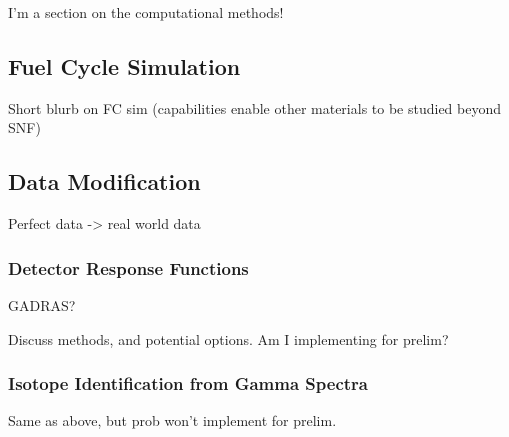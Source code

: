 I'm a section on the computational methods!

\subsection{Fuel Cycle Simulation}

Short blurb on FC sim (capabilities enable other materials to be studied beyond SNF)

\subsection{Data Modification}

Perfect data -> real world data

\subsubsection{Detector Response Functions}

GADRAS?

Discuss methods, and potential options. Am I implementing for prelim? 

\subsubsection{Isotope Identification from Gamma Spectra}

Same as above, but prob won't implement for prelim. 


